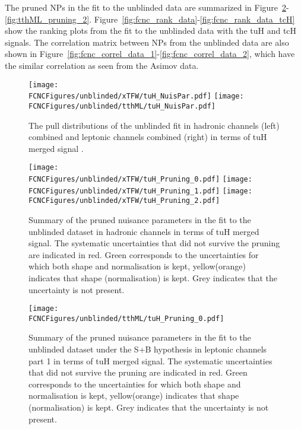 The pruned NPs in the fit to the unblinded data are summarized in Figure~\ref{fig:xTFW_pruning_0}-\ref{fig:tthML_pruning_2}.
Figure~\ref{fig:fcnc_rank_data}-\ref{fig:fcnc_rank_data_tcH} show the ranking plots from the fit to the unblinded data with the tuH and tcH signals.
The correlation matrix between NPs from the unblinded data are also shown in Figure~\ref{fig:fcnc_correl_data_1}-\ref{fig:fcnc_correl_data_2}, which have the similar correlation as
seen from the Asimov data. 





\begin{figure}[htb]
\centering
\texttt{[image: \\FCNCFigures/unblinded/xTFW/tuH\_NuisPar.pdf]}
\texttt{[image: \\FCNCFigures/unblinded/tthML/tuH\_NuisPar.pdf]}
\caption{ The pull distributions of the unblinded fit in hadronic channels (left) combined and leptonic channels combined (right) in terms of tuH merged signal . }
\label{fig:fcnc_pull_data}
\end{figure}


\begin{figure}[htb]
\centering
\texttt{[image: \\FCNCFigures/unblinded/xTFW/tuH\_Pruning\_0.pdf]}
\texttt{[image: \\FCNCFigures/unblinded/xTFW/tuH\_Pruning\_1.pdf]}
\texttt{[image: \\FCNCFigures/unblinded/xTFW/tuH\_Pruning\_2.pdf]}
\caption{ Summary of the pruned nuisance parameters in the fit to the unblinded dataset in hadronic channels in terms of tuH merged signal. The systematic uncertainties that did not survive the pruning are indicated in red. Green corresponds to the uncertainties for which both shape and normalisation is kept, yellow(orange) indicates that shape (normalisation) is kept. Grey indicates that the uncertainty is not present.}
\label{fig:xTFW_pruning_0}
\end{figure}


\begin{figure}[htb]
\centering
\texttt{[image: \\FCNCFigures/unblinded/tthML/tuH\_Pruning\_0.pdf]}
\caption{ Summary of the pruned nuisance parameters in the fit to the unblinded dataset under the S+B hypothesis in leptonic channels part 1 in terms of tuH merged signal. The systematic uncertainties that did not survive the pruning are indicated in red. Green corresponds to the uncertainties for which both shape and normalisation is kept, yellow(orange) indicates that shape (normalisation) is kept. Grey indicates that the uncertainty is not present.}
\label{fig:tthML_pruning_0}
\end{figure}

